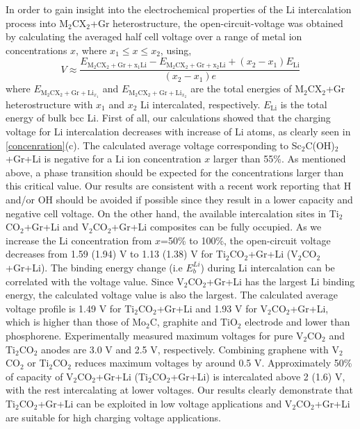 In order to gain insight into the electrochemical properties of the Li intercalation process into M$_2$CX$_2$+Gr heterostructure, the open-circuit-voltage was obtained by calculating the averaged half cell voltage over a range of metal ion concentrations $x$, where $x_1\leq x\leq x_2$, using,
\begin{equation}
V\approx\frac{E_{\mathrm{M}_2\mathrm{C}\mathrm{X}_2+\mathrm{Gr}+\mathrm{x_1Li}}-E_{\mathrm{M}_2\mathrm{C}\mathrm{X}_2+\mathrm{Gr}+\mathrm{x_2Li}}+(x_2-x_1)E_{\mathrm{Li}}}{(x_2-x_1)e}
\end{equation}
where $E_{\mathrm{M}_2\mathrm{C}\mathrm{X}_2+\mathrm{Gr}+\mathrm{Li}_{x_1}}$ and $E_{\mathrm{M}_2\mathrm{C}\mathrm{X}_2+\mathrm{Gr}+\mathrm{Li}_{x_2}}$ are the total energies of M$_2$CX$_2$+Gr heterostructure with $x_1$ and $x_2$ Li intercalated, respectively.  $E_{\mathrm{Li}}$ is the total energy of bulk bcc Li.  First of all, our calculations showed that the charging voltage for Li intercalation decreases with increase of Li atoms, as clearly seen in \autoref{concenration}(c). The calculated average voltage corresponding to Sc$_2$C(OH)$_2$+Gr+Li is negative for a Li ion concentration $x$ larger than 55\%. As mentioned above, a phase transition should be expected for the concentrations larger than this critical value. Our results are consistent with a recent work reporting that H and/or OH should be avoided if possible since they result in a lower capacity and negative cell voltage\cite{Xie2014,Tang2012}. On the other hand, the available intercalation sites in Ti$_2$CO$_2$+Gr+Li and V$_2$CO$_2$+Gr+Li composites can be fully occupied.
As we increase the Li concentration from $x$=50\% to 100\%, the open-circuit voltage decreases from 1.59 (1.94) V to 1.13 (1.38) V for Ti$_2$CO$_2$+Gr+Li (V$_2$CO$_2$+Gr+Li). The binding energy change (i.e $E_{b}^{Li}$) during Li intercalation can be correlated with the voltage value. Since V$_2$CO$_2$+Gr+Li has the largest Li binding energy, the calculated voltage value is also the largest. The calculated average voltage profile is 1.49 V for Ti$_2$CO$_2$+Gr+Li and 1.93 V for V$_2$CO$_2$+Gr+Li, which is higher than those of Mo$_2$C\cite{C6TA01918H}, graphite\cite{ceder4} and TiO$_2$ electrode \cite{tio2-voltage} and lower than phosphorene\cite{doi:10.1021/nl504336h}. Experimentally measured maximum voltages for pure V$_2$CO$_2$ and Ti$_2$CO$_2$ anodes are 3.0 V and 2.5 V, respectively\cite{doi:10.1021/ja405735d,gdgdgd}. Combining graphene with V$_2$CO$_2$ or Ti$_2$CO$_2$ reduces maximum voltages by around 0.5 V.  Approximately 50\% of capacity of V$_2$CO$_2$+Gr+Li (Ti$_2$CO$_2$+Gr+Li) is intercalated above 2 (1.6) V, with the rest intercalating at lower voltages. Our results clearly demonstrate that Ti$_2$CO$_2$+Gr+Li can be exploited in low voltage applications and V$_2$CO$_2$+Gr+Li are suitable for high charging voltage applications.

